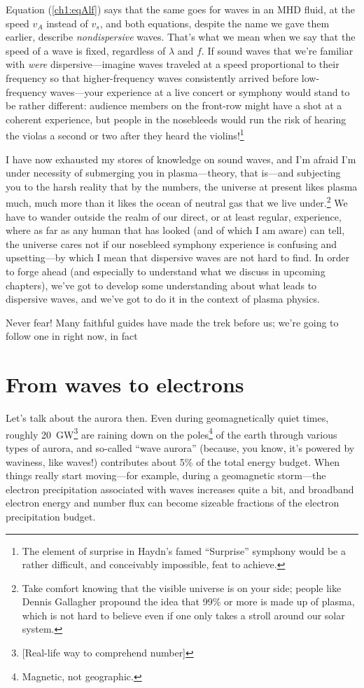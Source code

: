 Equation (\ref{ch1:eqAlf}) says that the same goes for waves in an MHD
fluid, at the speed $v_A$ instead of $v_s$, and both equations,
despite the name we gave them earlier, describe \emph{nondispersive}
waves. That's what we mean when we say that the speed of a wave is
fixed, regardless of $\lambda$ and $f$. If sound waves that we're
familiar with \emph{were} dispersive---imagine waves traveled at a
speed proportional to their frequency so that higher-frequency waves
consistently arrived before low-frequency waves---your experience at a
live concert or symphony would stand to be rather different: audience
members on the front-row might have a shot at a coherent experience,
but people in the nosebleeds would run the risk of hearing the violas
a second or two after they heard the violins!\footnote{The element of
  surprise in Haydn's famed ``Surprise'' symphony would be a rather
  difficult, and conceivably impossible, feat to achieve.}

I have now exhausted my stores of knowledge on sound waves, and I'm
afraid I'm under necessity of submerging you in plasma---theory, that
is---and subjecting you to the harsh reality that by the numbers, the
universe at present likes plasma much, much more than it likes the
ocean of neutral gas that we live under.\footnote{Take comfort knowing
  that the visible universe is on your side; people like Dennis
  Gallagher propound the idea that 99\% or more is made up of plasma,
  which is not hard to believe even if one only takes a stroll around
  our solar system.} We have to wander outside the realm of our
direct, or at least regular, experience, where as far as any human
that has looked (and of which I am aware) can tell, the universe cares
not if our nosebleed symphony experience is confusing and
upsetting---by which I mean that dispersive waves are not hard to
find. In order to forge ahead (and especially to understand what we
discuss in upcoming chapters), we've got to develop some understanding
about what leads to dispersive waves, and we've got to do it in the
context of plasma physics.

Never fear! Many faithful guides have made the trek before us; we're
going to follow one in right now, in fact


\section{From waves to electrons}

Let's talk about the aurora then. Even during geomagnetically quiet
times, roughly 20~GW\footnote{[Real-life way to comprehend number]}
\citep{Newell2009} are raining down on the poles\footnote{Magnetic, not geographic.} of the
earth through various types of aurora, and so-called ``wave aurora''
(because, you know, it's powered by waviness, like \Alf waves!)
contributes about 5\% of the total energy budget. When things really
start moving---for example, during a geomagnetic storm---the electron
precipitation associated with \Alf waves increases quite a bit, and
broadband electron energy and number flux can become sizeable
fractions of the electron precipitation budget.

